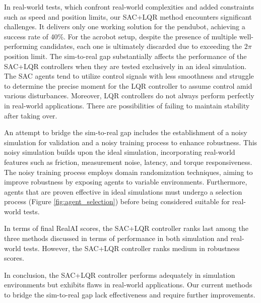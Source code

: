 In real-world tests, which confront real-world complexities and added constraints such as speed and position limits, our SAC+LQR method encounters significant challenges. It delivers only one working solution for the pendubot, achieving a success rate of 40\%. For the acrobot setup, despite the presence of multiple well-performing candidates, each one is ultimately discarded due to exceeding the \(2\pi\) position limit. The sim-to-real gap substantially affects the performance of the SAC+LQR controllers when they are tested exclusively in an ideal simulation. The SAC agents tend to utilize control signals with less smoothness and struggle to determine the precise moment for the LQR controller to assume control amid various disturbances. Moreover, LQR controllers do not always perform perfectly in real-world applications. There are possibilities of failing to maintain stability after taking over.

An attempt to bridge the sim-to-real gap includes the establishment of a noisy simulation for validation and a noisy training process to enhance robustness. This noisy simulation builds upon the ideal simulation, incorporating real-world features such as friction, measurement noise, latency, and torque responsiveness. The noisy training process employs domain randomization techniques, aiming to improve robustness by exposing agents to variable environments. Furthermore, agents that are proven effective in ideal simulations must undergo a selection process (Figure \ref{fig:agent_selection}) before being considered suitable for real-world tests.

In terms of final RealAI scores, the SAC+LQR controller ranks last among the three methods discussed in terms of performance in both simulation and real-world tests. However, the SAC+LQR controller ranks medium in robustness scores.

In conclusion, the SAC+LQR controller performs adequately in simulation environments but exhibits flaws in real-world applications. Our current methods to bridge the sim-to-real gap lack effectiveness and require further improvements.

\cleardoublepage
